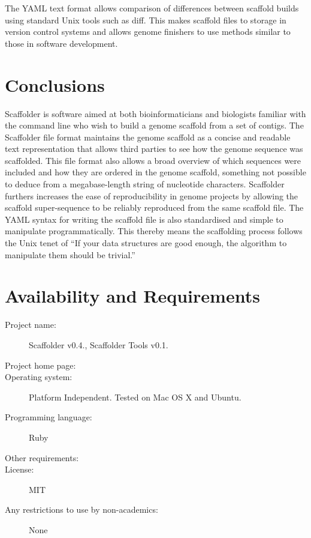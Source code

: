 \documentclass[10pt]{bmc_article}
\newenvironment{bmcformat}{\begin{raggedright}\baselineskip20pt\sloppy\setboolean{publ}{false}}{\end{raggedright}\baselineskip20pt\sloppy}
\begin{document}
\begin{bmcformat}
The YAML text format  allows comparison of differences between
scaffold builds using standard Unix tools such as diff. This 
makes scaffold files  to storage in version control systems and
allows genome finishers to use methods similar to those in software
development. \pb 

\clearpage

\section*{Conclusions} %

Scaffolder is software aimed at both bioinformaticians and biologists familiar
with the command line who wish to build a genome scaffold from a set of
contigs. The Scaffolder file format maintains the genome scaffold as a concise
and readable text representation that allows third parties to see how the
genome sequence was scaffolded. This file format also allows a broad overview
of which sequences were included and how they are ordered in the genome
scaffold, something not possible to deduce from a megabase-length string of
nucleotide characters. Scaffolder furthers increases the ease of
reproducibility in genome projects by allowing the scaffold super-sequence to
be reliably reproduced from the same scaffold file. The YAML syntax for
writing the scaffold file is also standardised and simple to manipulate
programmatically. This thereby means the scaffolding process follows the Unix
tenet of ``If your data structures are good enough, the algorithm to
manipulate them should be trivial.''

\clearpage

\section*{Availability and Requirements} %

  \begin{description}
    \item[Project name:] Scaffolder v0.4., Scaffolder Tools
    v0.1.
    \item[Project home page:] \scaffolder
    \item[Operating system:] Platform Independent. Tested on Mac OS X and
    Ubuntu.
    \item[Programming language:] Ruby 
    \item[Other requirements:] 
    \item[License:] MIT \item[Any restrictions to use by non-academics:] None
    \end{description}


\end{bmcformat}
\end{document}
